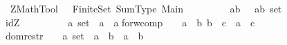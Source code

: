 %
\begin{isabellebody}%
\def\isabellecontext{ZMathTool}%
%
\isamarkuptrue%
%
\isadelimtheory
%
\endisadelimtheory
%
\isatagtheory
{}\isamarkupfalse%
\ ZMathTool\ \ \ Finite{\isacharunderscore}Set\ Sum{\isacharunderscore}Type\ Main\ %
\endisatagtheory
{\isafoldtheory}%
%
\isadelimtheory
%
\endisadelimtheory
\isanewline
\isanewline
{}\isamarkupfalse%
\ \ \ \ \ \ \ \ {\isacharparenleft}{\isacharprime}a{\isacharcomma}{\isacharprime}b{\isacharparenright}\ {\isachardoublequoteopen}{\isacharless}{\isacharequal}{\isachargreater}{\isachardoublequoteclose}\ {\isacharequal}\ {\isachardoublequoteopen}{\isacharparenleft}{\isacharprime}a{\isacharasterisk}{\isacharprime}b{\isacharparenright}\ set{\isachardoublequoteclose}\ \ \ \ \ {\isacharparenleft}\ {}{}{\isacharparenright}\isanewline
\isanewline
{}\isamarkupfalse%
\isanewline
\isanewline
idZ\ \ \ \ \ \ \ \ \ \ {\isacharcolon}{\isacharcolon}{\isachardoublequoteopen}{\isacharprime}a\ set\ {\isacharequal}{\isachargreater}\ {\isacharparenleft}{\isacharprime}a\ {\isacharless}{\isacharequal}{\isachargreater}\ {\isacharprime}a{\isacharparenright}{\isachardoublequoteclose}\isanewline
forw{\isacharunderscore}comp\ \ \ \ {\isacharcolon}{\isacharcolon}{\isachardoublequoteopen}{\isacharbrackleft}{\isacharprime}a\ {\isacharless}{\isacharequal}{\isachargreater}\ {\isacharprime}b{\isacharcomma}\ {\isacharprime}b\ {\isacharless}{\isacharequal}{\isachargreater}\ {\isacharprime}c{\isacharbrackright}\ {\isacharequal}{\isachargreater}\ {\isacharparenleft}{\isacharprime}a\ {\isacharless}{\isacharequal}{\isachargreater}\ {\isacharprime}c{\isacharparenright}{\isachardoublequoteclose}\ \ {\isacharparenleft}{\isachardoublequoteopen}{\isacharunderscore}\ {\isacharpercent}{\isacharsemicolon}\ {\isacharunderscore}{\isachardoublequoteclose}\ \ {\isacharbrackleft}{}{}{\isacharcomma}{}{}{\isacharbrackright}\ {}{}{\isacharparenright}\isanewline
dom{\isacharunderscore}restr\ \ \ \ {\isacharcolon}{\isacharcolon}{\isachardoublequoteopen}{\isacharbrackleft}{\isacharprime}a\ set\ {\isacharcomma}\ {\isacharprime}a\ {\isacharless}{\isacharequal}{\isachargreater}\ {\isacharprime}b{\isacharbrackright}\ {\isacharequal}{\isachargreater}\ {\isacharparenleft}{\isacharprime}a\ {\isacharless}{\isacharequal}{\isachargreater}\ {\isacharprime}b{\isacharparenright}{\isachardoublequoteclose}\ \ \ \ {\isacharparenleft}{\isachardoublequoteopen}{\isacharunderscore}\ {\isacharless}{\isacharcolon}\ {\isacharunderscore}{\isachardoublequoteclose}\ \ {\isacharbrackleft}{}{}{\isacharcomma}{}{}{\isacharbrackright}\ {}{}{\isacharparenright}\isanewline

\end{isabellebody}
